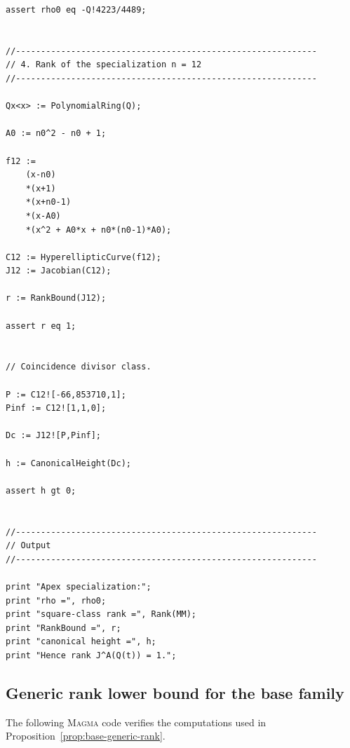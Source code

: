 \documentclass[11pt]{amsart}
\theoremstyle{plain}
\theoremstyle{remark}
\theoremstyle{plain}
\begin{document}
\begin{verbatim}
assert rho0 eq -Q!4223/4489;


//------------------------------------------------------------
// 4. Rank of the specialization n = 12
//------------------------------------------------------------

Qx<x> := PolynomialRing(Q);

A0 := n0^2 - n0 + 1;

f12 :=
    (x-n0)
    *(x+1)
    *(x+n0-1)
    *(x-A0)
    *(x^2 + A0*x + n0*(n0-1)*A0);

C12 := HyperellipticCurve(f12);
J12 := Jacobian(C12);

r := RankBound(J12);

assert r eq 1;


// Coincidence divisor class.

P := C12![-66,853710,1];
Pinf := C12![1,1,0];

Dc := J12![P,Pinf];

h := CanonicalHeight(Dc);

assert h gt 0;


//------------------------------------------------------------
// Output
//------------------------------------------------------------

print "Apex specialization:";
print "rho =", rho0;
print "square-class rank =", Rank(MM);
print "RankBound =", r;
print "canonical height =", h;
print "Hence rank J^A(Q(t)) = 1.";
\end{verbatim}


\subsection{Generic rank lower bound for the base family}\label{app:generic-rank-base}

The following \textsc{Magma} code verifies the computations used in
Proposition~\ref{prop:base-generic-rank}.
\end{document}
